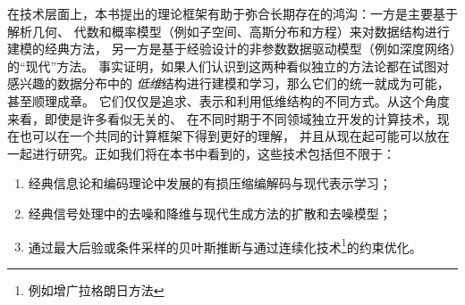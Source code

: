 \documentclass[../../book-main_zh.tex]{subfiles}
\begin{document}
在技术层面上，本书提出的理论框架有助于弥合长期存在的鸿沟：一方是主要基于解析几何、
代数和概率模型（例如子空间、高斯分布和方程）来对数据结构进行建模的经典方法，
另一方是基于经验设计的非参数数据驱动模型（例如深度网络）的“现代”方法。
事实证明，如果人们认识到这两种看似独立的方法论都在试图对感兴趣的数据分布中的
{\em 低维}结构进行建模和学习，那么它们的统一就成为可能，甚至顺理成章。
它们仅仅是追求、表示和利用低维结构的不同方式。从这个角度来看，即使是许多看似无关的、
在不同时期于不同领域独立开发的计算技术，现在也可以在一个共同的计算框架下得到更好的理解，
并且从现在起可能可以放在一起进行研究。正如我们将在本书中看到的，这些技术包括但不限于：
\begin{enumerate}
    \item 经典信息论和编码理论中发展的有损压缩编解码与现代表示学习；
    \item 经典信号处理中的去噪和降维与现代生成方法的扩散和去噪模型；
    \item 通过最大后验或条件采样的贝叶斯推断与通过连续化技术\footnote{例如增广拉格朗日方法}的约束优化。
\end{enumerate}
\end{document}
